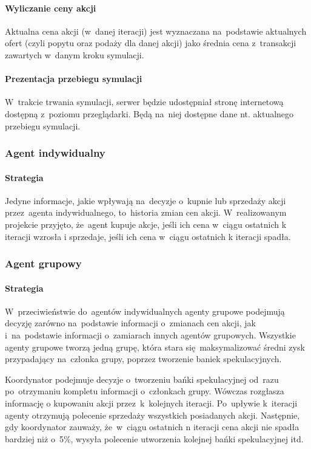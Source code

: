 \documentclass[11pt,a4paper]{article}
\begin{document}
\paragraph{Wyliczanie ceny akcji}
Aktualna cena akcji (w~danej iteracji) jest wyznaczana na~podstawie aktualnych ofert (czyli popytu oraz podaży dla danej akcji) jako średnia cena z~transakcji zawartych w~danym kroku symulacji.

\paragraph{Prezentacja przebiegu symulacji}
W~trakcie trwania symulacji, serwer będzie udostępniał stronę internetową dostępną z~poziomu przeglądarki. Będą na~niej dostępne dane nt. aktualnego przebiegu symulacji.

\subsubsection{Agent indywidualny}
\paragraph{Strategia}
Jedyne informacje, jakie wpływają na~decyzje o~kupnie lub sprzedaży akcji przez~agenta indywidualnego, to~historia zmian cen akcji. W~realizowanym projekcie przyjęto, że~agent kupuje akcje, jeśli ich cena w~ciągu ostatnich k iteracji wzrosła i sprzedaje, jeśli ich cena w~ciągu ostatnich k iteracji spadła.

\newpage
\subsubsection{Agent grupowy}
\paragraph{Strategia}
W~przeciwieństwie do~agentów indywidualnych agenty grupowe podejmują decyzję zarówno na~podstawie informacji o~zmianach cen akcji, jak i~na~podstawie informacji o~zamiarach innych agentów grupowych. Wszystkie agenty grupowe tworzą jedną grupę, która stara się~maksymalizować średni zysk przypadający na~członka grupy, poprzez tworzenie baniek spekulacyjnych. 

Koordynator podejmuje decyzje o~tworzeniu bańki spekulacyjnej od~razu po~otrzymaniu kompletu informacji o~członkach grupy. Wówczas rozgłasza informację o kupowaniu akcji przez~k~kolejnych iteracji. Po~upływie k~iteracji agenty otrzymują polecenie sprzedaży wszystkich posiadanych akcji. Następnie, gdy koordynator zauważy, że~w~ciągu ostatnich n iteracji cena akcji nie spadła bardziej niż o~5\%, wysyła polecenie utworzenia kolejnej bańki spekulacyjnej itd.
\end{document}

